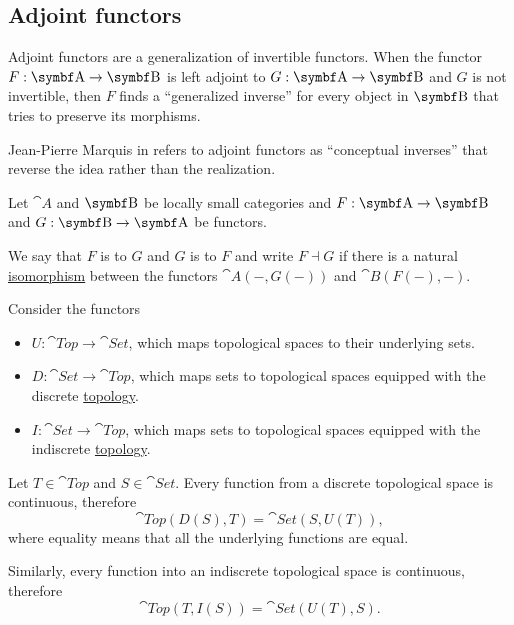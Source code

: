 \subsection{Adjoint functors}\label{subsec:adjoint_functors}

\begin{remark}\label{def:adjoint_functors}
  Adjoint functors are a generalization of invertible functors. When the functor \( F: \cat{A} \to \bfop B \) is left adjoint to \( G: \cat{A} \to \bfop B \) and \( G \) is not invertible, then \( F \) finds a \enquote{generalized inverse} for every object in \( \bfop B \) that tries to preserve its morphisms.

  Jean-Pierre Marquis in \cite{StanfordPlato:category_theory} refers to adjoint functors as \enquote{conceptual inverses} that reverse the idea rather than the realization.
\end{remark}

\begin{definition}\label{def:adjoint_functor}\mcite\cite[exer. 4.1.32]{Leinster2014}
  Let \( \cat{A} \) and \( \bfop B \) be locally small categories and \( F: \cat{A} \to \bfop B \) and \( G: \bfop B \to \cat{A} \) be functors.

  We say that \( F \) is  to \( G \) and \( G \) is  to \( F \) and write \( F \dashv G \) if there is a natural \hyperref[def:natural_isomorpism]{isomorphism} between the functors \( \cat{A}(-, G(-)) \) and \( \cat{B}(F(-), -) \).
\end{definition}

\begin{example}\label{ex:top_adjoint_functor}\mcite\cite[exmpl. 2.1.5]{Leinster2014}
  Consider the functors
  \begin{itemize}
    \item \( U: \cat{Top} \to \cat{Set} \), which maps topological spaces to their underlying sets.
    \item \( D: \cat{Set} \to \cat{Top} \), which maps sets to topological spaces equipped with the discrete \hyperref[def:standard_topologies/discrete]{topology}.
    \item \( I: \cat{Set} \to \cat{Top} \), which maps sets to topological spaces equipped with the indiscrete \hyperref[def:standard_topologies/indiscrete]{topology}.
  \end{itemize}

  Let \( T \in \cat{Top} \) and \( S \in \cat{Set} \). Every function from a discrete topological space is continuous, therefore
  \begin{equation*}
    \cat{Top}(D(S), T) = \cat{Set}(S, U(T)),
  \end{equation*}
  where equality means that all the underlying functions are equal.

  Similarly, every function into an indiscrete topological space is continuous, therefore
  \begin{equation*}
    \cat{Top}(T, I(S)) = \cat{Set}(U(T), S).
  \end{equation*}
\end{example}
